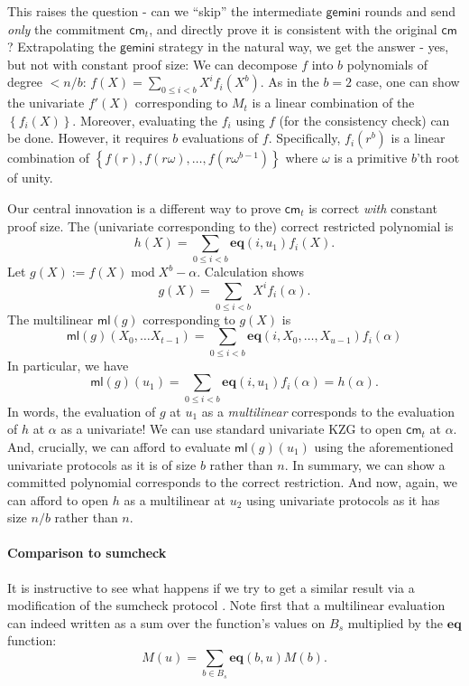 \documentclass[11pt]{article} %
\newcommand{\gemini}{\ensuremath{\mathsf{gemini}}\xspace}
\newcommand{\cm}{\ensuremath{\mathsf{cm}}\xspace}
\newcommand{\defeq}{:=}
\renewcommand{\mod}{\ensuremath{\;\mathrm{mod}\;}}
\newcommand{\prv}{\ensuremath{\mathsf{\mathbf{P}}}\xspace}
\newcommand{\ver}{\ensuremath{\mathsf{\mathbf{V}}}\xspace}
\newcommand{\set}[1]{\ensuremath{\left\{#1\right\}}\xspace}
\renewcommand{\g}{\ensuremath{\mathsf{g}}\xspace}
\newcommand{\eq}{\ensuremath{\mathsf{eq}}\xspace}
\renewcommand{\eq}{\ensuremath{\mathbf{eq}}\xspace}
\newcommand{\mle}[1]{\ensuremath{\mathsf{ml}(#1)}\xspace}
\newcommand{\B}[1]{\ensuremath{B_{#1}}\xspace}
\begin{document}
This raises the question - can we ``skip'' the intermediate \gemini rounds and send \emph{only} the commitment $\cm_t$, and directly prove it is consistent with the original \cm?
Extrapolating the \gemini strategy in the natural way, we get the answer - yes, but not with constant proof size:
We can decompose $f$ into $b$ polynomials of degree $<n/b$: $f(X)=\sum_{0\leq i <b} X^i f_i(X^b)$.
As in the $b=2$ case, one can show the univariate $f'(X)$ corresponding to $M_t$ is a linear combination
of the \set{f_i(X)}. Moreover, evaluating the $f_i$ using $f$ (for the consistency check) can be done.
However, it requires $b$ evaluations of $f$. Specifically,
$f_i(r^b)$ is a linear combination of  $\set{f(r),f(r\omega),\ldots,f(r\omega^{b-1})}$ where $\omega$ is a primitive $b$'th root of unity.


Our central innovation is a different way to prove $\cm_t$ is correct \emph{with} constant proof size.
The (univariate corresponding to the) correct restricted polynomial is 
\[h(X) = \sum_{0\leq i < b} \eq(i,u_1)f_i(X).\]
Let $g(X)\defeq f(X) \mod X^b-\alpha$.
Calculation shows
\[g(X)= \sum_{0\leq i < b} X^i f_i(\alpha).\]
The multilinear $\mle{g}$ corresponding to $g(X)$ is 
\[\mle{g}(X_0,\ldots X_{t-1}) = \sum_{0\leq i < b} \eq(i,X_0,\ldots,X_{u-1})f_i(\alpha)
\]
In particular, we have 
\[\mle{g}(u_1) = \sum_{0\leq i < b} \eq(i,u_1)f_i(\alpha)=h(\alpha).\]
In words, the evaluation of $g$ at $u_1$ as a \emph{multilinear} corresponds to 
the evaluation of $h$ at $\alpha$ as a univariate!
We can use standard univariate KZG to open $\cm_t$ at $\alpha$.
And, crucially, we can afford to evaluate $\mle{g}(u_1)$ using the aforementioned univariate protocols as it is of size $b$ rather than $n$.
In summary, we can show a committed polynomial corresponds to the correct restriction. And now, again, we can afford to open $h$ as a multilinear at $u_2$ using univariate protocols
as it has size $n/b$ rather than $n$.
\paragraph{Comparison to sumcheck}
It is instructive to see what  happens if we try to get a similar result via a modification of the sumcheck protocol \cite{lfkn}.
Note first that a multilinear evaluation can indeed   written as a sum over the function's values on \B{s} multiplied by the \eq function:
$$ M(u) = \sum_{b \in B_s} \eq(b, u) M(b). $$
\end{document}
